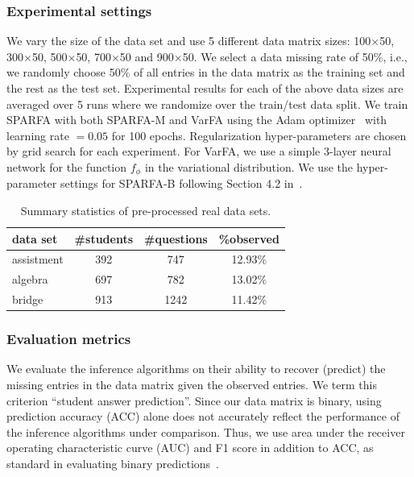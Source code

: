 \subsubsection*{Experimental settings}
We vary the size of the data set and use 5 different data matrix sizes:
100$\times$50, 300$\times$50, 500$\times$50, 700$\times$50 and 900$\times$50.
We select a data missing rate of 50\%, i.e., we randomly choose 50\% of all
entries in the data matrix as the training set and the rest as the test set.
Experimental results for each of the above data sizes are averaged over 5 runs
where we randomize over the train/test data split. We train SPARFA with both
SPARFA-M and VarFA using the Adam optimizer~\cite{kingma2014adam} with learning
rate $=0.05$ for 100 epochs. Regularization hyper-parameters are chosen by grid
search for each experiment. For VarFA, we use a simple 3-layer neural network
for the function $f_\phi$ in the variational distribution. We use the
hyper-parameter settings for SPARFA-B following Section 4.2 in~\cite{lan14a}.
%
\begin{table}
    \caption{Summary statistics of pre-processed real data sets.}
    \begin{tabular}{lccc}
        \toprule
        \textbf{data set}          & \textbf{\#students} & \textbf{\#questions} & \textbf{\%observed} \\ \hline
        assistment \Tstrut \Bstrut & 392                 & 747                  & 12.93\%             \\
        algebra                    & 697                 & 782                  & 13.02\%             \\
        bridge                     & 913                 & 1242                 & 11.42\%             \\ \bottomrule
    \end{tabular}
    \label{tab:data-stat}
\end{table}

\subsubsection*{Evaluation metrics} We evaluate the inference algorithms on their ability to recover (predict) the
missing entries in the data matrix given the observed entries. We term this
criterion ``student answer prediction''. Since our data matrix is binary, using
prediction accuracy (ACC) alone does not accurately reflect the performance of
the inference algorithms under comparison. Thus, we use area under the receiver
operating characteristic curve (AUC) and F1 score in addition to ACC, as
standard in evaluating binary predictions~\cite{hastie2009elements}.
%

